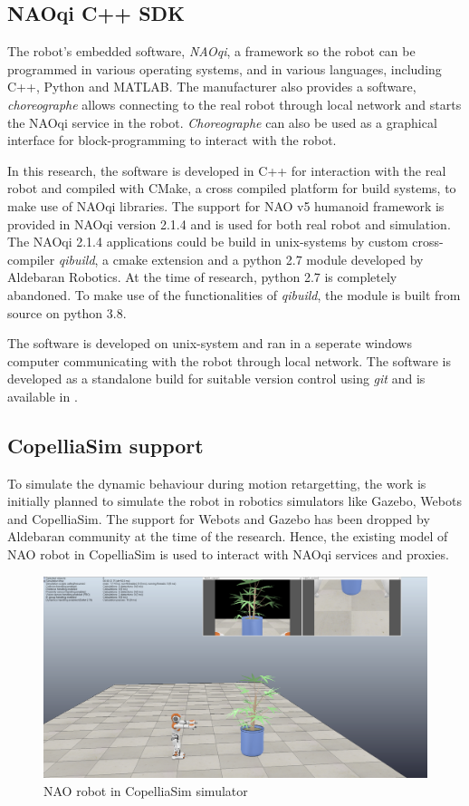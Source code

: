 \subsection{NAOqi C++ SDK}

The robot's embedded software, \textit{NAOqi}, a framework so the robot can be programmed in various operating systems, and in various languages, including C++, Python and MATLAB. 
The manufacturer also provides a software, \textit{choreographe} allows connecting to the real robot through local network and starts the NAOqi service in the robot.
\textit{Choreographe} can also be used as a graphical interface for block-programming to interact with the robot.

In this research, the software is developed in C++ for interaction with the real robot and compiled with CMake, a cross compiled platform for build systems, to make use of 
NAOqi libraries. The support for NAO v5 humanoid framework is provided in NAOqi version 2.1.4 and is used for both real robot and simulation. The NAOqi 2.1.4 applications could be build in unix-systems by custom cross-compiler \textit{qibuild}, a cmake extension and a python 2.7 module developed by Aldebaran 
Robotics. At the time of research, python 2.7 is completely abandoned. To make use of the functionalities of \textit{qibuild}, the module is built from source on python 3.8.

The software is developed on unix-system and ran in a seperate windows computer communicating with the robot through local network. The software is developed as a standalone build for suitable version control using \textit{git} and is available in 
\cite{github}.

\subsection{CopelliaSim support}
To simulate the dynamic behaviour during motion retargetting, the work is initially planned to simulate the robot in robotics simulators like Gazebo, Webots and CopelliaSim. 
The support for Webots and Gazebo has been dropped by Aldebaran community at the time of the research. Hence, the existing model of NAO robot in CopelliaSim is used to interact 
with NAOqi services and proxies. 


\begin{figure}[h!]
    \centering
    \includegraphics[scale=0.235]{images/copellia-sim.png}\hfill
    \caption{NAO robot in CopelliaSim simulator}\hfill
    \label{fig: copellia-sim}
\end{figure}

